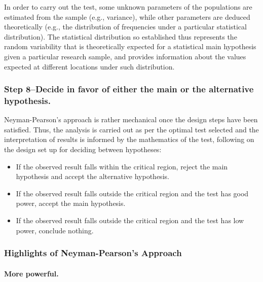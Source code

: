 \documentclass[
]{book}
\providecommand{\tightlist}{%
  \setlength{\itemsep}{0pt}\setlength{\parskip}{0pt}}
\theoremstyle{definition}
\theoremstyle{definition}
\theoremstyle{definition}
\theoremstyle{definition}
\theoremstyle{remark}
\begin{document}
In order to carry out the test, some unknown parameters of the populations are estimated from the sample (e.g., variance), while other parameters are deduced theoretically (e.g., the distribution of frequencies under a particular statistical distribution). The statistical distribution so established thus represents the random variability that is theoretically expected for a statistical main hypothesis given a particular research sample, and provides information about the values expected at different locations under such distribution.

\hypertarget{step-8decide-in-favor-of-either-the-main-or-the-alternative-hypothesis.}{%
\subsubsection*{Step 8--Decide in favor of either the main or the alternative hypothesis.}\label{step-8decide-in-favor-of-either-the-main-or-the-alternative-hypothesis.}}

Neyman-Pearson's approach is rather mechanical once the design steps have been satisfied. Thus, the analysis is carried out as per the optimal test selected and the interpretation of results is informed by the mathematics of the test, following on the design set up for deciding between hypotheses:

\begin{itemize}
\tightlist
\item
  If the observed result falls within the critical region, reject the main hypothesis and accept the alternative hypothesis.
\item
  If the observed result falls outside the critical region and the test has good power, accept the main hypothesis.
\item
  If the observed result falls outside the critical region and the test has low power, conclude nothing.
\end{itemize}

\hypertarget{highlights-of-neyman-pearsons-approach}{%
\subsubsection{Highlights of Neyman-Pearson's Approach}\label{highlights-of-neyman-pearsons-approach}}

\hypertarget{more-powerful.}{%
\paragraph*{More powerful.}\label{more-powerful.}}
\end{document}
